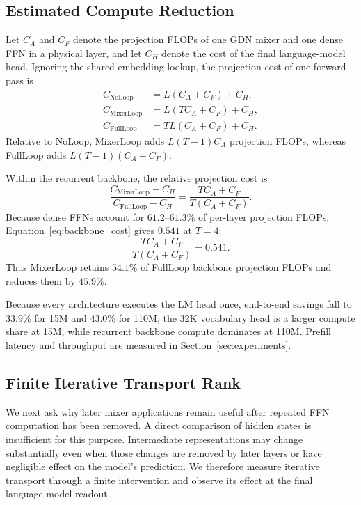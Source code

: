 \documentclass[letterpaper]{article} %
\begin{document}
\subsection{Estimated Compute Reduction}

Let $C_A$ and $C_F$ denote the projection FLOPs of
one GDN mixer and one dense FFN in a physical layer, and let $C_H$ denote the
cost of the final language-model head. Ignoring the shared embedding lookup,
the projection cost of one forward pass is
\begin{align}
C_{\mathrm{NoLoop}}
&=
L(C_A+C_F)+C_H,\\
C_{\mathrm{MixerLoop}}
&=
L(TC_A+C_F)+C_H,\\
C_{\mathrm{FullLoop}}
&=
TL(C_A+C_F)+C_H.
\end{align}
Relative to NoLoop, MixerLoop adds $L(T-1)C_A$ projection FLOPs, whereas
FullLoop adds $L(T-1)(C_A+C_F)$.

Within the recurrent backbone, the relative projection cost is
\begin{equation}
\frac{
C_{\mathrm{MixerLoop}}-C_H
}{
C_{\mathrm{FullLoop}}-C_H
}
=
\frac{TC_A+C_F}{T(C_A+C_F)}.
\label{eq:backbone_cost}
\end{equation}
Because dense FFNs account for $61.2$--$61.3\%$ of per-layer projection FLOPs,
Equation~\ref{eq:backbone_cost} gives $0.541$ at $T=4$:
\begin{equation}
\frac{TC_A+C_F}{T(C_A+C_F)}
=0.541.
\end{equation}
Thus MixerLoop retains $54.1\%$ of FullLoop backbone projection FLOPs and
reduces them by $45.9\%$.

Because every architecture executes the LM head once, end-to-end savings fall
to $33.9\%$ for 15M and $43.0\%$ for 110M; the 32K vocabulary head is a larger
compute share at 15M, while recurrent backbone compute dominates at 110M.
Prefill latency and throughput are measured in Section~\ref{sec:experiments}.

\subsection{Finite Iterative Transport Rank}
\label{sec:finite_itr}

We next ask why later mixer applications remain useful after repeated FFN computation has been removed. A direct
comparison of hidden states is insufficient for this purpose. Intermediate
representations may change substantially even when those changes are removed
by later layers or have negligible effect on the model's prediction. We
therefore measure iterative transport through a finite intervention and observe
its effect at the final language-model readout.
\end{document}
